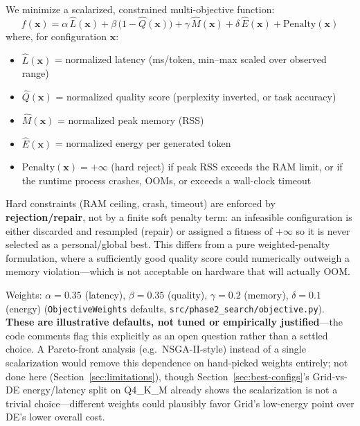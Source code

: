 \documentclass[journal]{IEEEtran}
\begin{document}
We minimize a scalarized, constrained multi-objective function:
\begin{equation}
\label{eq:objective}
f(\mathbf{x}) = \alpha\,\hat{L}(\mathbf{x}) + \beta\,\bigl(1-\hat{Q}(\mathbf{x})\bigr) + \gamma\,\hat{M}(\mathbf{x}) + \delta\,\hat{E}(\mathbf{x}) + \mathrm{Penalty}(\mathbf{x})
\end{equation}
where, for configuration $\mathbf{x}$:
\begin{itemize}
  \item $\hat{L}(\mathbf{x})$ = normalized latency (ms/token, min--max scaled over observed range)
  \item $\hat{Q}(\mathbf{x})$ = normalized quality score (perplexity inverted, or task accuracy)
  \item $\hat{M}(\mathbf{x})$ = normalized peak memory (RSS)
  \item $\hat{E}(\mathbf{x})$ = normalized energy per generated token
  \item $\mathrm{Penalty}(\mathbf{x}) = +\infty$ (hard reject) if peak RSS exceeds the RAM limit, or if the runtime process crashes, OOMs, or exceeds a wall-clock timeout
\end{itemize}

Hard constraints (RAM ceiling, crash, timeout) are enforced by \textbf{rejection/repair}, not by a finite soft penalty term: an infeasible configuration is either discarded and resampled (repair) or assigned a fitness of $+\infty$ so it is never selected as a personal/global best. This differs from a pure weighted-penalty formulation, where a sufficiently good quality score could numerically outweigh a memory violation---which is not acceptable on hardware that will actually OOM.

Weights: $\alpha=0.35$ (latency), $\beta=0.35$ (quality), $\gamma=0.2$ (memory), $\delta=0.1$ (energy) (\texttt{ObjectiveWeights} defaults, \texttt{src/phase2\_search/objective.py}). \textbf{These are illustrative defaults, not tuned or empirically justified}---the code comments flag this explicitly as an open question rather than a settled choice. A Pareto-front analysis (e.g.\ NSGA-II-style) instead of a single scalarization would remove this dependence on hand-picked weights entirely; not done here (Section~\ref{sec:limitations}), though Section~\ref{sec:best-configs}'s Grid-vs-DE energy/latency split on Q4\_K\_M already shows the scalarization is not a trivial choice---different weights could plausibly favor Grid's low-energy point over DE's lower overall cost.
\end{document}

